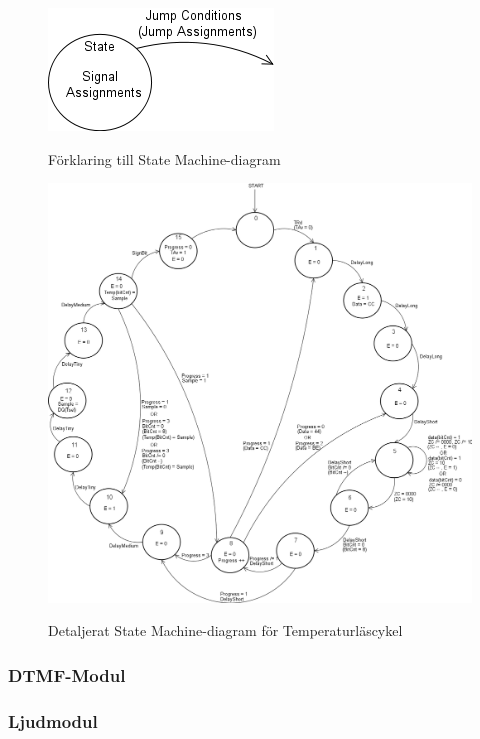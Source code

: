 \documentclass[a4paper,11pt]{article}
\begin{document}
	\begin{figure}[ht!tb]
	  \centering
	      \includegraphics[scale=0.5, angle=0]{StateMachineExplained.png}
		\label{fig:SMExp}
	  	\caption{Förklaring till State Machine-diagram}
	\end{figure}

	\begin{figure}[ht!tb]
	  \centering
	      \includegraphics[scale=0.4, angle=0]{TempStateMachineDiagram.png}
		\label{fig:TempSM}
	  	\caption{Detaljerat State Machine-diagram för Temperaturläscykel}
	\end{figure}

		\subsubsection{DTMF-Modul}
		\subsubsection{Ljudmodul}
\end{document}
